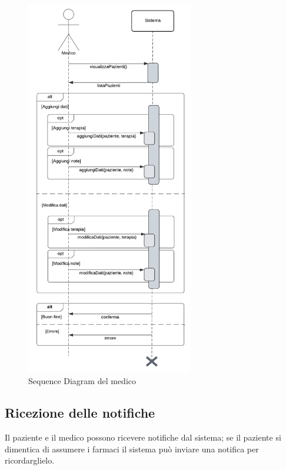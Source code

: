\documentclass[a4paper]{article}
\begin{document}
\begin{figure}[H]
  \centering
  \includegraphics[width=0.65\textwidth]{sdMedico}
  \caption{Sequence Diagram del medico}
  \label{fig:sdMedico}
\end{figure}

\subsection{Ricezione delle notifiche}

Il paziente e il medico possono ricevere notifiche dal sistema; se il paziente si dimentica di assumere i farmaci
il sistema può inviare una notifica per ricordarglielo. 
\end{document}
